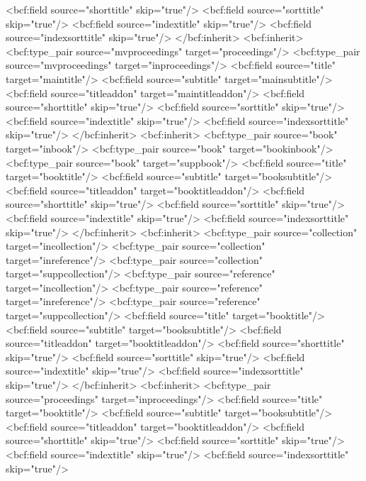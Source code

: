       <bcf:field source="shorttitle" skip="true"/>
      <bcf:field source="sorttitle" skip="true"/>
      <bcf:field source="indextitle" skip="true"/>
      <bcf:field source="indexsorttitle" skip="true"/>
    </bcf:inherit>
    <bcf:inherit>
      <bcf:type_pair source="mvproceedings" target="proceedings"/>
      <bcf:type_pair source="mvproceedings" target="inproceedings"/>
      <bcf:field source="title" target="maintitle"/>
      <bcf:field source="subtitle" target="mainsubtitle"/>
      <bcf:field source="titleaddon" target="maintitleaddon"/>
      <bcf:field source="shorttitle" skip="true"/>
      <bcf:field source="sorttitle" skip="true"/>
      <bcf:field source="indextitle" skip="true"/>
      <bcf:field source="indexsorttitle" skip="true"/>
    </bcf:inherit>
    <bcf:inherit>
      <bcf:type_pair source="book" target="inbook"/>
      <bcf:type_pair source="book" target="bookinbook"/>
      <bcf:type_pair source="book" target="suppbook"/>
      <bcf:field source="title" target="booktitle"/>
      <bcf:field source="subtitle" target="booksubtitle"/>
      <bcf:field source="titleaddon" target="booktitleaddon"/>
      <bcf:field source="shorttitle" skip="true"/>
      <bcf:field source="sorttitle" skip="true"/>
      <bcf:field source="indextitle" skip="true"/>
      <bcf:field source="indexsorttitle" skip="true"/>
    </bcf:inherit>
    <bcf:inherit>
      <bcf:type_pair source="collection" target="incollection"/>
      <bcf:type_pair source="collection" target="inreference"/>
      <bcf:type_pair source="collection" target="suppcollection"/>
      <bcf:type_pair source="reference" target="incollection"/>
      <bcf:type_pair source="reference" target="inreference"/>
      <bcf:type_pair source="reference" target="suppcollection"/>
      <bcf:field source="title" target="booktitle"/>
      <bcf:field source="subtitle" target="booksubtitle"/>
      <bcf:field source="titleaddon" target="booktitleaddon"/>
      <bcf:field source="shorttitle" skip="true"/>
      <bcf:field source="sorttitle" skip="true"/>
      <bcf:field source="indextitle" skip="true"/>
      <bcf:field source="indexsorttitle" skip="true"/>
    </bcf:inherit>
    <bcf:inherit>
      <bcf:type_pair source="proceedings" target="inproceedings"/>
      <bcf:field source="title" target="booktitle"/>
      <bcf:field source="subtitle" target="booksubtitle"/>
      <bcf:field source="titleaddon" target="booktitleaddon"/>
      <bcf:field source="shorttitle" skip="true"/>
      <bcf:field source="sorttitle" skip="true"/>
      <bcf:field source="indextitle" skip="true"/>
      <bcf:field source="indexsorttitle" skip="true"/>
